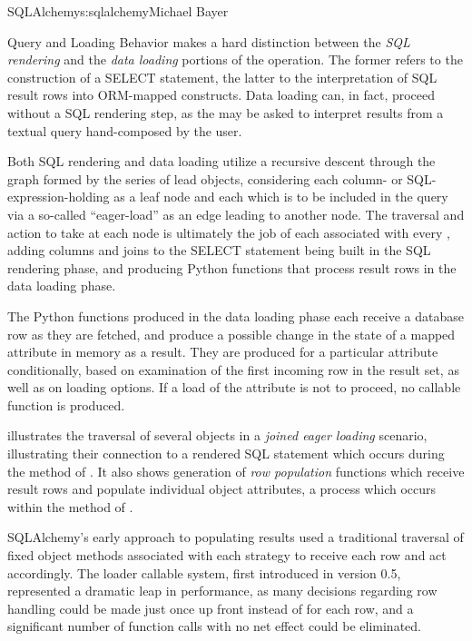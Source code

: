 \begin{aosachapter}{SQLAlchemy}{s:sqlalchemy}{Michael Bayer}
\begin{aosasect1}{Query and Loading Behavior}
 makes a hard distinction between the \emph{SQL rendering}
and the \emph{data loading} portions of the operation.  The former refers to the construction
of a SELECT statement, the latter to the interpretation of SQL result rows into
ORM-mapped constructs.   Data loading can, in fact, proceed
without a SQL rendering step, as the  may be asked to interpret results from
a textual query hand-composed by the user.

Both SQL rendering and data loading utilize a recursive descent through
the graph formed by the series of lead  objects,
considering each column- or SQL-expression-holding  as a leaf node and each
 which is to be included in the query via a so-called ``eager-load''
as an edge leading to another  node.   The traversal and action to take at each node
is ultimately the job of each  associated with every ,
adding columns and joins to the SELECT statement being built in the SQL rendering phase,
and producing Python functions that process result rows in the data loading phase.

The Python functions produced in the data loading phase each receive a database row
as they are fetched, and produce a possible change in the state of
a mapped attribute in memory as a result.   They are produced for a particular attribute
conditionally, based on examination of the first incoming row in the result set, as well as
on loading options.   If a load of the attribute is not to proceed, no callable function is produced.

 illustrates the traversal of several  objects in a \emph{joined eager loading}
scenario, illustrating their connection to a rendered SQL statement which occurs during the 
method of .  It also shows generation of \emph{row population} functions which receive result rows
and populate individual object attributes, a process which occurs within the  method of .


SQLAlchemy's early approach to populating results used a traditional traversal
of fixed object methods associated with each strategy to receive each row and
act accordingly. The loader callable system, first introduced in version 0.5,
represented a dramatic leap in performance, as many decisions regarding row
handling could be made just once up front instead of for each row, and a
significant number of function calls with no net effect could be eliminated.


\end{aosasect1}
\end{aosachapter}
